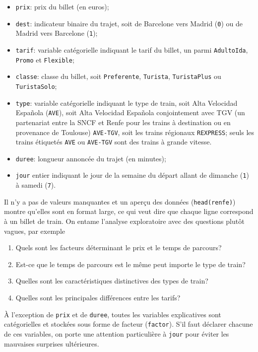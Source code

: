 \documentclass[
  11pt,
  letterpaper,
]{book}
\providecommand{\tightlist}{%
  \setlength{\itemsep}{0pt}\setlength{\parskip}{0pt}}
\theoremstyle{definition}
\theoremstyle{definition}
\theoremstyle{definition}
\theoremstyle{remark}
\begin{document}
\begin{itemize}
\tightlist
\item
  \texttt{prix}: prix du billet (en euros);
\item
  \texttt{dest}: indicateur binaire du trajet, soit de Barcelone vers Madrid (\texttt{0}) ou de Madrid vers Barcelone (\texttt{1});
\item
  \texttt{tarif}: variable catégorielle indiquant le tarif du billet, un parmi \texttt{AdultoIda}, \texttt{Promo} et \texttt{Flexible};
\item
  \texttt{classe}: classe du billet, soit \texttt{Preferente}, \texttt{Turista}, \texttt{TuristaPlus} ou \texttt{TuristaSolo};
\item
  \texttt{type}: variable catégorielle indiquant le type de train, soit Alta Velocidad Española (\texttt{AVE}), soit Alta Velocidad Española conjointement avec TGV (un partenariat entre la SNCF et Renfe pour les trains à destination ou en provenance de Toulouse) \texttt{AVE-TGV}, soit les trains régionaux \texttt{REXPRESS}; seuls les trains étiquetés \texttt{AVE} ou \texttt{AVE-TGV} sont des trains à grande vitesse.
\item
  \texttt{duree}: longueur annoncée du trajet (en minutes);
\item
  \texttt{jour} entier indiquant le jour de la semaine du départ allant de dimanche (\texttt{1}) à samedi (\texttt{7}).
\end{itemize}

Il n'y a pas de valeurs manquantes et un aperçu des données (\texttt{head(renfe)}) montre qu'elles sont en format large, ce qui veut dire que chaque ligne correspond à un billet de train. On entame l'analyse exploratoire avec des questions plutôt vagues, par exemple

\begin{enumerate}
\def\labelenumi{\arabic{enumi}.}
\tightlist
\item
  Quels sont les facteurs déterminant le prix et le temps de parcours?
\item
  Est-ce que le temps de parcours est le même peut importe le type de train?
\item
  Quelles sont les caractéristiques distinctives des types de train?
\item
  Quelles sont les principales différences entre les tarifs?
\end{enumerate}

À l'exception de \texttt{prix} et de \texttt{duree}, toutes les variables explicatives sont catégorielles et stockées sous forme de facteur (\texttt{factor}). S'il faut déclarer chacune de ces variables, on porte une attention particulière à \texttt{jour} pour éviter les mauvaises surprises ultérieures.
\end{document}
